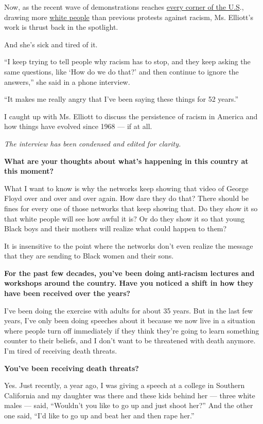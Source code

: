 Now, as the recent wave of demonstrations reaches
\href{https://www.nytimes3xbfgragh.onion/interactive/2020/06/13/us/george-floyd-protests-cities-photos.html}{every
corner of the U.S}., drawing more
\href{https://www.nytimes3xbfgragh.onion/2020/06/12/us/george-floyd-white-protesters.html}{white
people} than previous protests against racism, Ms. Elliott's work is
thrust back in the spotlight.

And she's sick and tired of it.

``I keep trying to tell people why racism has to stop, and they keep
asking the same questions, like `How do we do that?' and then continue
to ignore the answers,'' she said in a phone interview.

``It makes me really angry that I've been saying these things for 52
years.''

I caught up with Ms. Elliott to discuss the persistence of racism in
America and how things have evolved since 1968 --- if at all.

\emph{The interview has been condensed and edited for clarity.}

\textbf{What are your thoughts about what's happening in this country at
this moment?}

What I want to know is why the networks keep showing that video of
George Floyd over and over and over again. How dare they do that? There
should be fines for every one of those networks that keep showing that.
Do they show it so that white people will see how awful it is? Or do
they show it so that young Black boys and their mothers will realize
what could happen to them?

It is insensitive to the point where the networks don't even realize the
message that they are sending to Black women and their sons.

\textbf{For the past few decades, you've been doing anti-racism lectures
and workshops around the country. Have you noticed a shift in how they
have been received over the years?}

I've been doing the exercise with adults for about 35 years. But in the
last few years, I've only been doing speeches about it because we now
live in a situation where people turn off immediately if they think
they're going to learn something counter to their beliefs, and I don't
want to be threatened with death anymore. I'm tired of receiving death
threats.

\textbf{You've been receiving death threats?}

Yes. Just recently, a year ago, I was giving a speech at a college in
Southern California and my daughter was there and these kids behind her
--- three white males --- said, ``Wouldn't you like to go up and just
shoot her?'' And the other one said, ``I'd like to go up and beat her
and then rape her.''

